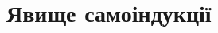 \documentclass[onlytextwidth]{beamer}
\begin{document}



\section{Явище самоіндукції}
\end{document}
